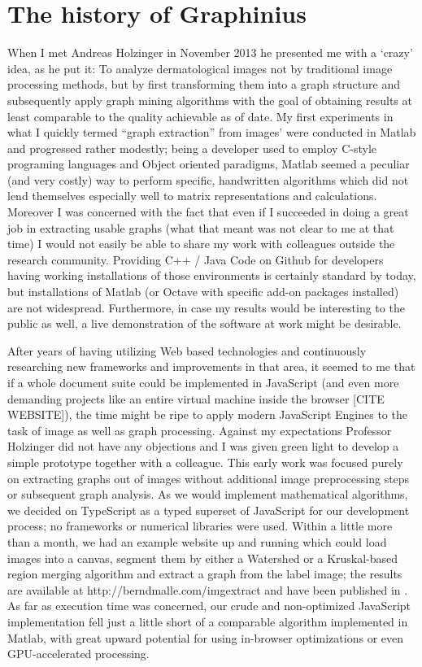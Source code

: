 \section{The history of Graphinius}
\label{sect:ogma_history}
When I met Andreas Holzinger in November 2013 he presented me with a `crazy' idea, as he put it: To analyze dermatological images not by traditional image processing methods, but by first transforming them into a graph structure and subsequently apply graph mining algorithms with the goal of obtaining results at least comparable to the quality achievable as of date. My first experiments in what I quickly termed ``graph extraction'' from images' were conducted in Matlab and progressed rather modestly; being a developer used to employ C-style programing languages and Object oriented paradigms, Matlab seemed a peculiar (and very costly) way to perform specific, handwritten algorithms which did not lend themselves especially well to matrix representations and calculations. Moreover I was concerned with the fact that even if I succeeded in doing a great job in extracting usable graphs (what that meant was not clear to me at that time) I would not easily be able to share my work with colleagues outside the research community. Providing C++ / Java Code on Github for developers having working installations of those environments is certainly standard by today, but installations of Matlab (or Octave with specific add-on packages installed) are not widespread. Furthermore, in case my results would be interesting to the public as well, a live demonstration of the software at work might be desirable.

\par

After years of having utilizing Web based technologies and continuously researching new frameworks and improvements in that area, it seemed to me that if a whole document suite could be implemented in JavaScript (and even more demanding projects like an entire virtual machine inside the browser [CITE WEBSITE]), the time might be ripe to apply modern JavaScript Engines to the task of image as well as graph processing. Against my expectations Professor Holzinger did not have any objections and I was given green light to develop a simple prototype together with a colleague. This early work was focused purely on extracting graphs out of images without additional image preprocessing steps or subsequent graph analysis. As we would implement mathematical algorithms, we decided on TypeScript as a typed superset of JavaScript for our development process; no frameworks or numerical libraries were used. Within a little more than a month, we had an example website up and running which could load images into a canvas, segment them by either a Watershed or a Kruskal-based region merging algorithm and extract a graph from the label image; the results are available at http://berndmalle.com/imgextract and have been published in \cite{GraphExtractPaper}. As far as execution time was concerned, our crude and non-optimized JavaScript implementation fell just a little short of a comparable algorithm implemented in Matlab, with great upward potential for using in-browser optimizations or even GPU-accelerated processing.

